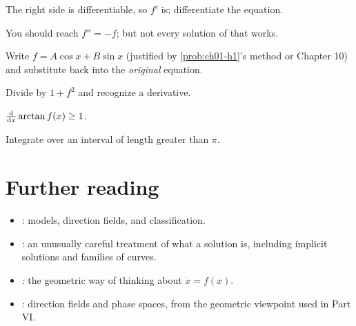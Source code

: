 \begin{hintlevels}
  \item The right side is differentiable, so $f'$ is; differentiate the equation.
  \item You should reach $f'' = -f$; but not every solution of that works.
  \item Write $f = A\cos x + B\sin x$ (justified by \cref{prob:ch01-h1}'s method
        or Chapter 10) and substitute back into the \emph{original} equation.
\end{hintlevels}

\begin{hintlevels}
  \item Divide by $1 + f^2$ and recognize a derivative.
  \item $\frac{\mathrm{d}}{\mathrm{d}x}\arctan f(x)\ge 1$.
  \item Integrate over an interval of length greater than $\pi$.
\end{hintlevels}

\section{Further reading}\label{sec:ch01-reading}

\begin{itemize}
  \item \textcite[\S1.1--1.3]{BoyceDiPrima}: models, direction fields, and
        classification.
  \item \textcite[Ch.~1]{TenenbaumPollard}: an unusually careful treatment of
        what a solution is, including implicit solutions and families of
        curves.
  \item \textcite[\S2.1]{Strogatz}: the geometric way of thinking about
        $\dot x = f(x)$.
  \item \textcite[Ch.~1]{Arnold}: direction fields and phase spaces, from the
        geometric viewpoint used in Part VI.
\end{itemize}
